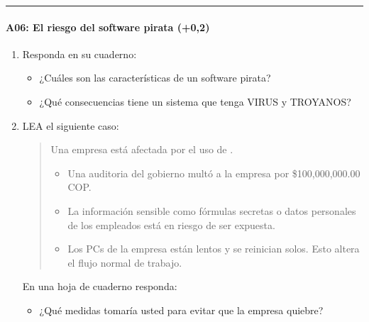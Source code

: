 \documentclass[letterpaper,10pt,spanish]{sphinxmanual}
\begin{document}
\bigskip\hrule\bigskip



\paragraph{A06: El riesgo del software pirata (+0,2)}
\label{\detokenize{cursos/ofimatica10/periodo01/G02:a06-el-riesgo-del-software-pirata-0-2}}
\sphinxAtStartPar
{}
\begin{enumerate}
%
\item {} 
\sphinxAtStartPar
Responda en su cuaderno:
\begin{itemize}
\item {} 
\sphinxAtStartPar
¿Cuáles son las características de un software pirata?

\item {} 
\sphinxAtStartPar
¿Qué consecuencias tiene un sistema que tenga VIRUS y TROYANOS?

\end{itemize}

\item {} 
\sphinxAtStartPar
LEA el siguiente caso:
\begin{quote}

\sphinxAtStartPar
Una empresa está afectada por el uso de .
\begin{itemize}
\item {} 
\sphinxAtStartPar
Una auditoria del gobierno multó a la empresa por \$100,000,000.00 COP.

\item {} 
\sphinxAtStartPar
La información sensible como fórmulas secretas o datos personales de los empleados está en riesgo de ser expuesta.

\item {} 
\sphinxAtStartPar
Los PCs de la empresa están lentos y se reinician solos. Esto altera el flujo normal de trabajo.

\end{itemize}
\end{quote}

\sphinxAtStartPar
En una hoja de cuaderno responda:
\begin{itemize}
\item {} 
\sphinxAtStartPar
¿Qué medidas tomaría usted para evitar que la empresa quiebre?

\end{itemize}

\end{enumerate}
\end{document}
